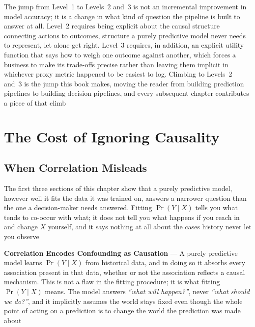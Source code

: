 The jump from Level~1 to Levels~2 and~3 is not an incremental improvement in model
accuracy; it is a change in what kind of question the pipeline is built to
answer at all. Level~2 requires being explicit about the causal structure connecting
actions to outcomes, structure a purely predictive model never needs to
represent, let alone get right. Level~3 requires, in addition, an explicit
utility function that says how to weigh one outcome against another, which forces
a business to make its trade-offs precise rather than leaving them implicit in whichever
proxy metric happened to be easiest to log. Climbing to Levels~2 and~3 is the
jump this book makes, moving the reader from building prediction pipelines to building
decision pipelines, and every subsequent chapter contributes a piece of that
climb

\section{The Cost of Ignoring Causality}
\label{chap:cost-ignoring-causality}

\subsection{When Correlation Misleads}
\label{sec:when-correlation-misleads}

The first three sections of this chapter show that a purely predictive model,
however well it fits the data it was trained on, answers a narrower question than
the one a decision-maker needs answered. Fitting $\Pr(Y \mid X)$ tells you what
tends to co-occur with what; it does not tell you what happens if you reach in and
change $X$ yourself, and it says nothing at all about the cases history never
let you observe

\textbf{Correlation Encodes Confounding as Causation} --- A purely predictive
model learns $\Pr(Y \mid X)$ from historical data, and in doing so it absorbs every
association present in that data, whether or not the association reflects a
causal mechanism. This is not a flaw in the fitting procedure; it is what
fitting $\Pr(Y \mid X)$ means. The model answers \emph{``what will happen?''}, never
\emph{``what should we do?''}, and it implicitly assumes the world stays fixed even
though the whole point of acting on a prediction is to change the world the prediction
was made about

